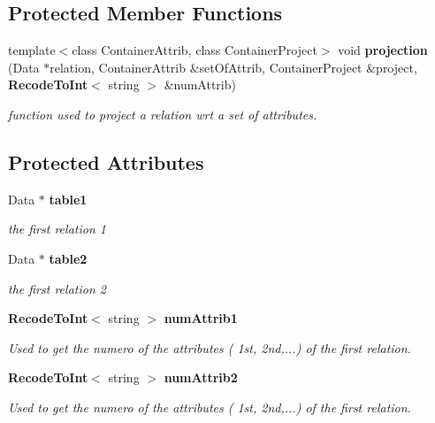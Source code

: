 \subsection*{Protected Member Functions}
\begin{CompactItemize}
\item 
template$<$class Container\-Attrib, class Container\-Project$>$ void {\bf projection} (Data $\ast$relation, Container\-Attrib \&set\-Of\-Attrib, Container\-Project \&project, {\bf Recode\-To\-Int}$<$ string $>$ \&num\-Attrib)
\begin{CompactList}\small\item\em function used to project a relation wrt a set of attributes. \item\end{CompactList}\end{CompactItemize}
\subsection*{Protected Attributes}
\begin{CompactItemize}
\item 
Data $\ast$ {\bf table1}\label{class_satisfied_i_n_d_40870e6e2f4d671c3658f4e9d9775b70}

\begin{CompactList}\small\item\em the first relation 1 \item\end{CompactList}\item 
Data $\ast$ {\bf table2}\label{class_satisfied_i_n_d_067ee67848d21e1bc5f04f1531e60a51}

\begin{CompactList}\small\item\em the first relation 2 \item\end{CompactList}\item 
{\bf Recode\-To\-Int}$<$ string $>$ {\bf num\-Attrib1}\label{class_satisfied_i_n_d_2e89ec65c6746fba9dc90eda29197867}

\begin{CompactList}\small\item\em Used to get the numero of the attributes ( 1st, 2nd,...) of the first relation. \item\end{CompactList}\item 
{\bf Recode\-To\-Int}$<$ string $>$ {\bf num\-Attrib2}\label{class_satisfied_i_n_d_01f0ff69e35875dbc6b9c02f7b514fc4}

\begin{CompactList}\small\item\em Used to get the numero of the attributes ( 1st, 2nd,...) of the first relation. \item\end{CompactList}\end{CompactItemize}
